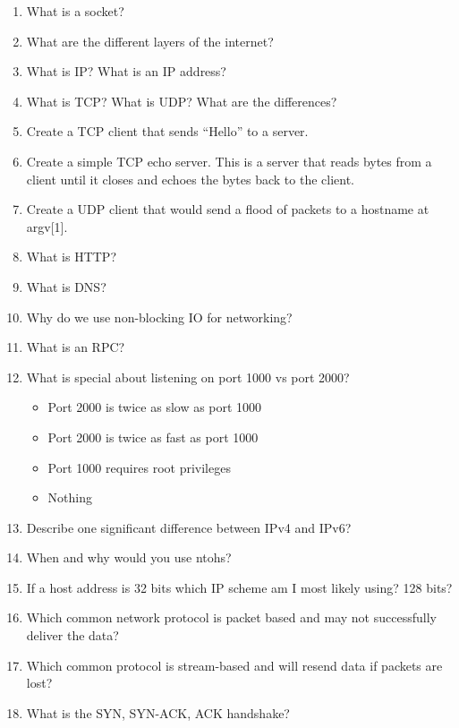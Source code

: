 \begin{enumerate}

\item What is a socket?
\item What are the different layers of the internet?
\item What is IP? What is an IP address?
\item What is TCP? What is UDP? What are the differences?
\item Create a TCP client that sends ``Hello'' to a server.
\item Create a simple TCP echo server. This is a server that reads bytes from a client until it closes and echoes the bytes back to the client.
\item Create a UDP client that would send a flood of packets to a hostname at argv[1].
\item What is HTTP?
\item What is DNS?
\item Why do we use non-blocking IO for networking?
\item What is an RPC?
\item What is special about listening on port 1000 vs port 2000?

\begin{itemize}
\tightlist
\item
  Port 2000 is twice as slow as port 1000
\item
  Port 2000 is twice as fast as port 1000
\item
  Port 1000 requires root privileges
\item
  Nothing
\end{itemize}

\item Describe one significant difference between IPv4 and IPv6?

\item When and why would you use ntohs?

\item If a host address is 32 bits which IP scheme am I most likely using? 128 bits?

\item Which common network protocol is packet based and may not successfully deliver the data?

\item Which common protocol is stream-based and will resend data if packets are lost?

\item What is the SYN, SYN-ACK, ACK handshake?


\end{enumerate}
